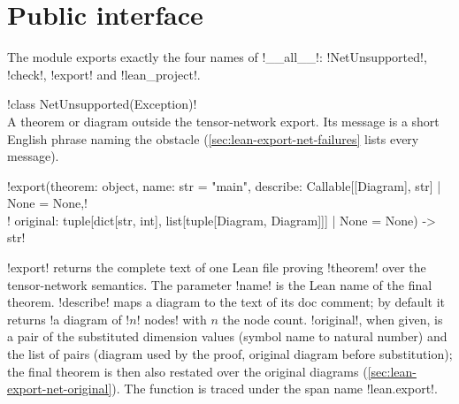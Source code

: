{\section{Public interface}\label{sec:lean-export-net-api}

The module exports exactly the four names of \py!__all__!: \py!NetUnsupported!, \py!check!,
\py!export! and \py!lean_project!.

\begin{signature}
\py!class NetUnsupported(Exception)!\\
A theorem or diagram outside the tensor-network export. Its message is a short English phrase
naming the obstacle (\cref{sec:lean-export-net-failures} lists every message).
\end{signature}

\begin{signature}
\py!export(theorem: object, name: str = "main", describe: Callable[[Diagram], str] | None = None,!\\
\py!       original: tuple[dict[str, int], list[tuple[Diagram, Diagram]]] | None = None) -> str!
\end{signature}

\noindent\py!export! returns the complete text of one Lean file proving \py!theorem! over the
tensor-network semantics. The parameter \py!name! is the Lean name of the final theorem.
\py!describe! maps a diagram to the text of its doc comment; by default it returns
\code!a diagram of !$n$\code! nodes! with $n$ the node count. \py!original!, when given, is a
pair of the substituted dimension values (symbol name to natural number) and the list of pairs
(diagram used by the proof, original diagram before substitution); the final theorem is then
also restated over the original diagrams (\cref{sec:lean-export-net-original}). The function is
traced under the span name \code!lean.export!.

}
